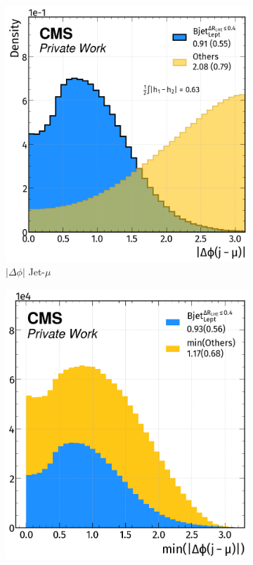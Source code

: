 \begin{figure}[H]
    \ContinuedFloat
    \vspace{-0.5cm}
    \centering
    
     \begin{subfigure}{0.49\linewidth}
        \centering
        \includegraphics[width=1\linewidth]{fig//chap08-kin_reco/dphi_mu.png}
        \caption{$|\Delta \phi|$ Jet-$\mu$}
    \end{subfigure}
    \hfill
    \begin{subfigure}{0.46\linewidth}  
        \centering
        \includegraphics[width=1\linewidth]{fig//chap08-kin_reco/min_dphi_mu.png}

\end{subfigure}
\end{figure}
